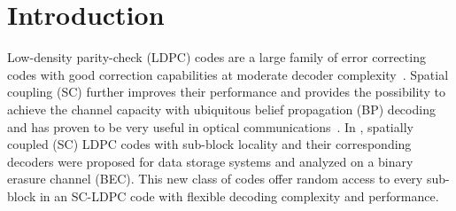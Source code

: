 \section{Introduction}
Low-density parity-check (LDPC) codes are a large family of error correcting codes with good correction capabilities at moderate decoder complexity~\cite{1057683,leven2014status}. Spatial coupling (SC) further improves their performance and provides the possibility to achieve the channel capacity with  ubiquitous belief propagation (BP) decoding~\cite{6589171,5695130} and has proven to be very useful in optical communications~\cite{schmalen2015spatially}. In \cite{9594186,9174265}, spatially coupled (SC) LDPC codes with sub-block locality and their corresponding decoders were proposed for data storage systems and analyzed on a binary erasure channel (BEC). This new class of codes offer random access to every sub-block in an SC-LDPC code with flexible decoding complexity and performance.

